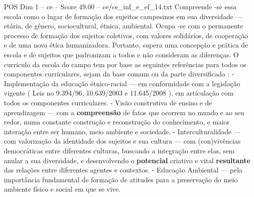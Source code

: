 \begin{textsample}{POS Dim 1 – ce – Score 49.00 – ce/ce\_inf\_e\_ef\_14.txt}
Compreende -se essa escola como o lugar de formação dos sujeitos campesinos em sua diversidade — etária, de gênero, sociocultural, étnica, ambiental.
Ocupa -se com o permanente processo de formação dos sujeitos coletivos, com valores solidários, de cooperação e de uma nova ética humanizadora.
Portanto, supera uma concepção e prática de escola e de sujeitos que padronizam a todos e não consideram as diferenças.
O currículo da escola do campo tem por base as seguintes referências para todos os componentes curriculares, sejam da base comum ou da parte diversificada : - Implementação da educação étnico-racial — em conformidade com a legislação vigente ( Leis no 9.394/96, 10.639/2003 e 11.645/2008 ), em articulação com todos os componentes curriculares. - Visão construtiva de ensino e de aprendizagem — com a \textbf{compreensão} de fatos que ocorrem no mundo e ao seu redor, numa constante construção e reconstrução do conhecimento, e maior interação entre ser humano, meio ambiente e sociedade. - Interculturalidade — com valorização da identidade dos sujeitos e sua cultura — com (con)vivências democráticas entre diferentes culturas, buscando a integração entre elas, sem anular a sua diversidade, e desenvolvendo o \textbf{potencial} criativo e vital \textbf{resultante} das relações entre diferentes agentes e contextos. - Educação Ambiental — pela importância fundamental de formação de atitudes para a preservação do meio ambiente físico e social em que se vive.

\end{textsample}
